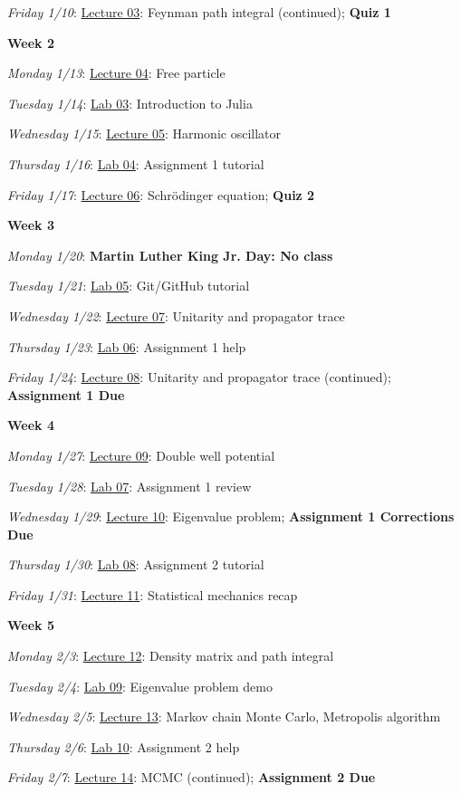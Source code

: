 \documentclass[12pt]{article}
\begin{document}
\emph{Friday 1/10}: \underline{Lecture 03}: Feynman path integral (continued); \textbf{Quiz 1}

\noindent\textbf{Week 2}

\emph{Monday 1/13}: \underline{Lecture 04}: Free particle

\emph{Tuesday 1/14}: \underline{Lab 03}: Introduction to Julia

\emph{Wednesday 1/15}: \underline{Lecture 05}: Harmonic oscillator

\emph{Thursday 1/16}: \underline{Lab 04}: Assignment 1 tutorial

\emph{Friday 1/17}: \underline{Lecture 06}: Schr\"{o}dinger equation; \textbf{Quiz 2}

\noindent\textbf{Week 3}

\emph{Monday 1/20}: \textbf{Martin Luther King Jr. Day: No class}

\emph{Tuesday 1/21}: \underline{Lab 05}: Git/GitHub tutorial

\emph{Wednesday 1/22}: \underline{Lecture 07}: Unitarity and propagator trace

\emph{Thursday 1/23}: \underline{Lab 06}: Assignment 1 help

\emph{Friday 1/24}: \underline{Lecture 08}: Unitarity and propagator trace (continued); \textbf{Assignment 1 Due}

\noindent\textbf{Week 4}

\emph{Monday 1/27}: \underline{Lecture 09}: Double well potential

\emph{Tuesday 1/28}: \underline{Lab 07}: Assignment 1 review

\emph{Wednesday 1/29}: \underline{Lecture 10}: Eigenvalue problem; \textbf{Assignment 1 Corrections Due}

\emph{Thursday 1/30}: \underline{Lab 08}: Assignment 2 tutorial

\emph{Friday 1/31}: \underline{Lecture 11}: Statistical mechanics recap

\noindent\textbf{Week 5}

\emph{Monday 2/3}: \underline{Lecture 12}: Density matrix and path integral

\emph{Tuesday 2/4}: \underline{Lab 09}: Eigenvalue problem demo

\emph{Wednesday 2/5}: \underline{Lecture 13}: Markov chain Monte Carlo, Metropolis algorithm

\emph{Thursday 2/6}: \underline{Lab 10}: Assignment 2 help

\emph{Friday 2/7}: \underline{Lecture 14}: MCMC (continued); \textbf{Assignment 2 Due}
\end{document}
